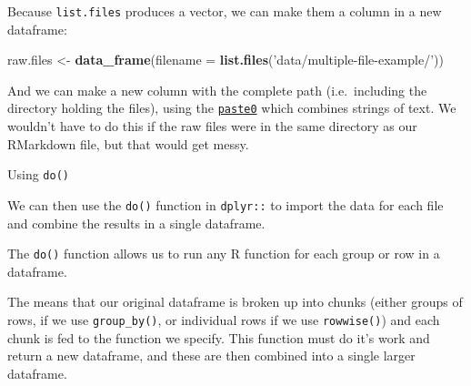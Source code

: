 \documentclass[]{article}
\newenvironment{Shaded}{\begin{snugshade}}{\end{snugshade}}
\newcommand{\KeywordTok}[1]{\textcolor[rgb]{0.13,0.29,0.53}{\textbf{#1}}}
\newcommand{\DataTypeTok}[1]{\textcolor[rgb]{0.13,0.29,0.53}{#1}}
\newcommand{\DecValTok}[1]{\textcolor[rgb]{0.00,0.00,0.81}{#1}}
\newcommand{\StringTok}[1]{\textcolor[rgb]{0.31,0.60,0.02}{#1}}
\newcommand{\OperatorTok}[1]{\textcolor[rgb]{0.81,0.36,0.00}{\textbf{#1}}}
\newcommand{\NormalTok}[1]{#1}
\theoremstyle{definition}
\theoremstyle{definition}
\theoremstyle{definition}
\theoremstyle{remark}
\begin{document}
Because \texttt{list.files} produces a vector, we can make them a column
in a new dataframe:

\begin{Shaded}
\begin{Highlighting}[]
\NormalTok{raw.files <-}\StringTok{ }\KeywordTok{data_frame}\NormalTok{(}\DataTypeTok{filename =} \KeywordTok{list.files}\NormalTok{(}\StringTok{'data/multiple-file-example/'}\NormalTok{))}
\end{Highlighting}
\end{Shaded}

And we can make a new column with the complete path (i.e.~including the
directory holding the files), using the
\protect\hyperlink{paste}{\texttt{paste0}} which combines strings of
text. We wouldn't have to do this if the raw files were in the same
directory as our RMarkdown file, but that would get messy.

\begin{Shaded}
\end{Shaded}

Using \texttt{do()}

We can then use the \texttt{do()} function in \texttt{dplyr::} to import
the data for each file and combine the results in a single dataframe.

The \texttt{do()} function allows us to run any R function for each
group or row in a dataframe.

The means that our original dataframe is broken up into chunks (either
groups of rows, if we use \texttt{group\_by()}, or individual rows if we
use \texttt{rowwise()}) and each chunk is fed to the function we
specify. This function must do it's work and return a new dataframe, and
these are then combined into a single larger dataframe.
\end{document}
